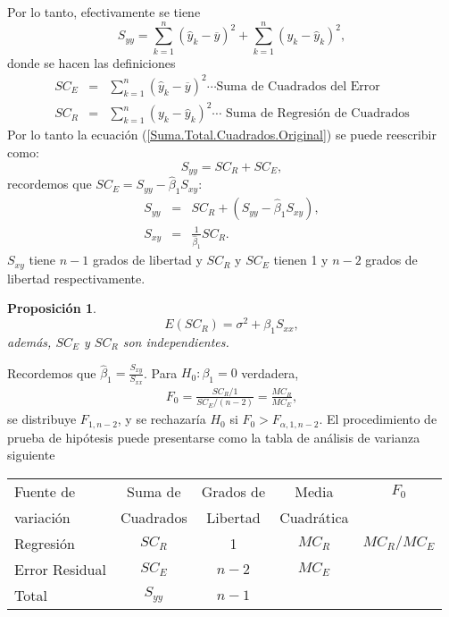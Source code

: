 \documentclass[a4paper]{report} %
\newtheorem{Prop}{Proposición}[chapter]
\begin{document}
Por lo tanto, efectivamente se tiene
\begin{equation}\label{Suma.Total.Cuadrados.Original}
S_{yy}=\sum_{k=1}^{n}\left(\hat{y}_{k}-\overline{y}\right)^{2}+\sum_{k=1}^{n}\left(y_{k}-\hat{y}_{k}\right)^{2},
\end{equation}
donde se hacen las definiciones
\begin{eqnarray}
SC_{E}&=&\sum_{k=1}^{n}\left(\hat{y}_{k}-\overline{y}\right)^{2}\cdots\textrm{Suma de Cuadrados del Error}\\
SC_{R}&=&\sum_{k=1}^{n}\left(y_{k}-\hat{y}_{k}\right)^{2}\cdots\textrm{ Suma de Regresi\'on de Cuadrados}
\end{eqnarray}
Por lo tanto la ecuaci\'on (\ref{Suma.Total.Cuadrados.Original}) se puede reescribir como: 
\begin{equation}\label{Suma.Total.Cuadrados.Dos.Original}
S_{yy}=SC_{R}+SC_{E},
\end{equation}
recordemos que $SC_{E}=S_{yy}-\hat{\beta}_{1}S_{xy}$:
\begin{eqnarray*}
S_{yy}&=&SC_{R}+\left( S_{yy}-\hat{\beta}_{1}S_{xy}\right),\\
S_{xy}&=&\frac{1}{\hat{\beta}_{1}}SC_{R}.
\end{eqnarray*}
$S_{xy}$ tiene $n-1$ grados de libertad y $SC_{R}$ y $SC_{E}$ tienen 1 y $n-2$ grados de libertad respectivamente.

\begin{Prop}
\begin{equation}
E\left(SC_{R}\right)=\sigma^{2}+\beta_{1}S_{xx},
\end{equation}
adem\'as, $SC_{E}$ y $SC_{R}$ son independientes.
\end{Prop}
Recordemos que $\hat{\beta}_{1}=\frac{S_{xy}}{S_{xx}}$. Para $H_{0}:\beta_{1}=0$ verdadera,
\begin{eqnarray*}
F_{0}=\frac{SC_{R}/1}{SC_{E}/(n-2)}=\frac{MC_{R}}{MC_{E}},
\end{eqnarray*}
se distribuye $F_{1,n-2}$, y se rechazar\'ia $H_{0}$ si $F_{0}>F_{\alpha,1,n-2}$. El procedimiento de prueba de hip\'otesis puede presentarse como la tabla de an\'alisis de varianza siguiente

\begin{center}
\begin{tabular}{lcccc}\hline
Fuente de & Suma de  &  Grados de  & Media  & $F_{0}$ \\ 
 variaci\'on & Cuadrados & Libertad & Cuadr\'atica & \\\hline
 Regresi\'on & $SC_{R}$ & 1 & $MC_{R}$  & $MC_{R}/MC_{E}$\\
 Error Residual & $SC_{E}$ & $n-2$ & $MC_{E}$ & \\\hline
 Total & $S_{yy}$ & $n-1$ & & \\\hline
\end{tabular} 
\end{center}
\end{document}
